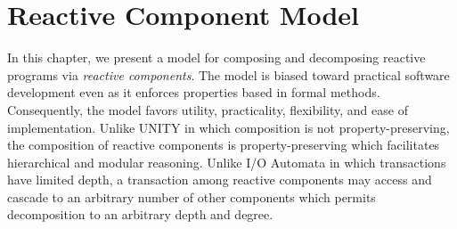 \chapter{Reactive Component Model \label{model}}

In this chapter, we present a model for composing and decomposing reactive programs via \emph{reactive components}.
The model is biased toward practical software development even as it enforces properties based in formal methods.
Consequently, the model favors utility, practicality, flexibility, and ease of implementation.
Unlike UNITY in which composition is not property-preserving, the composition of reactive components is property-preserving which facilitates hierarchical and modular reasoning.
Unlike I/O Automata in which transactions have limited depth, a transaction among reactive components may access and cascade to an arbitrary number of other components which permits decomposition to an arbitrary depth and degree.



